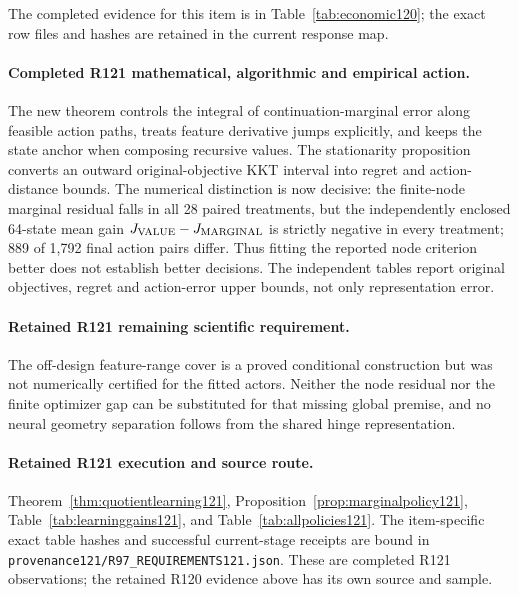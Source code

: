 The completed evidence for this item is in Table~\ref{tab:economic120}; the exact row files and hashes are retained in the current response map.

\paragraph{Completed R121 mathematical, algorithmic and empirical action.}
The new theorem controls the integral of continuation-marginal error along feasible action paths, treats feature derivative jumps explicitly, and keeps the state anchor when composing recursive values. The stationarity proposition converts an outward original-objective KKT interval into regret and action-distance bounds. The numerical distinction is now decisive: the finite-node marginal residual falls in all 28 paired treatments, but the independently enclosed 64-state mean gain $J_{\rm VALUE}-J_{\rm MARGINAL}$ is strictly negative in every treatment; 889 of 1,792 final action pairs differ. Thus fitting the reported node criterion better does not establish better decisions. The independent tables report original objectives, regret and action-error upper bounds, not only representation error.

\paragraph{Retained R121 remaining scientific requirement.}
The off-design feature-range cover is a proved conditional construction but was not numerically certified for the fitted actors. Neither the node residual nor the finite optimizer gap can be substituted for that missing global premise, and no neural geometry separation follows from the shared hinge representation.

\paragraph{Retained R121 execution and source route.}
Theorem~\ref{thm:quotientlearning121}, Proposition~\ref{prop:marginalpolicy121}, Table~\ref{tab:learninggains121}, and Table~\ref{tab:allpolicies121}.
The item-specific exact table hashes and successful current-stage receipts are bound in \nolinkurl{provenance121/R97_REQUIREMENTS121.json}. These are completed R121 observations; the retained R120 evidence above has its own source and sample.
